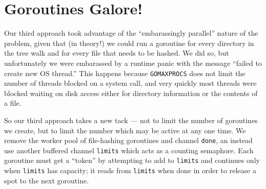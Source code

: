 \documentclass[12pt,notitlepage]{article}
\begin{document}
\section{Goroutines Galore!}
Our third approach took advantage of the ``embarassingly parallel'' nature of
the problem, given that (in theory!) we could run a goroutine for every directory in
the tree walk and for every file that needs to be hashed. We did so, but
unfortunately we were embarassed by a runtime panic with the message ``failed to
create new OS thread.'' This happens because \verb|GOMAXPROCS| does not limit the
number of threads blocked on a system call, and very quickly most threads were 
blocked waiting on disk access either for directory information or the contents 
of a file.

So our third approach takes a new tack --- not to limit the number of goroutines
we create, but to limit the number which may be active at any one time. We remove
the worker pool of file-hashing goroutines and channel \verb|done|, an instead
use another buffered channel \verb|limits| which acts as a counting semaphore.
Each goroutine must get a ``token'' by attempting to add to \verb|limits| and
continues only when \verb|limits| has capacity; it reads from \verb|limits| when
done in order to release a spot to the next goroutine.
\end{document}
